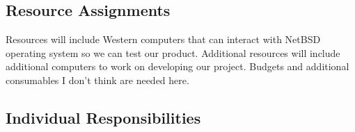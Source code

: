 \subsection{Resource Assignments}
%

Resources will include Western computers that can interact with NetBSD operating system so we can test our product. Additional resources will include 
additional computers to work on developing our project. Budgets and additional consumables I don’t think are needed here. 


\subsection{Individual Responsibilities}
%



